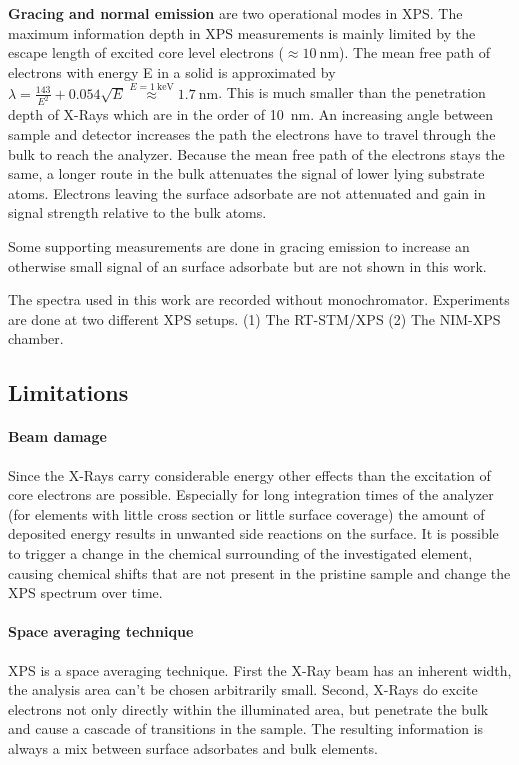 \textbf{Gracing and normal emission} are two operational modes in XPS. The maximum information depth in XPS measurements is mainly limited by the escape length of excited core level electrons ($\approx \SI{10}{\nano \meter}$). The mean free path of electrons with energy E in a solid is approximated by $\lambda = \frac{143}{E^2} + 0.054 \sqrt{E} \stackrel{E=\SI{1}{\kilo \eV}}{\approx} \SI{1.7}{\nano \meter}$.\cite{Seah_Quantitative_1979} This is much smaller than the penetration depth of X-Rays which are in the order of \SI{10}{\nano \meter}. An increasing angle between sample and detector increases the path the electrons have to travel through the bulk to reach the analyzer. Because the mean free path of the electrons stays the same, a longer route in the bulk attenuates the signal of lower lying substrate atoms. Electrons leaving the surface adsorbate are not attenuated and gain in signal strength relative to the bulk atoms.

Some supporting measurements are done in gracing emission to increase an otherwise small signal of an surface adsorbate but are not shown in this work.

The spectra used in this work are recorded without monochromator. Experiments are done at two different XPS setups. (1) The RT-STM/XPS (2) The NIM-XPS chamber.  

\subsection{Limitations}
\paragraph{Beam damage}
Since the X-Rays carry considerable energy other effects than the excitation of core electrons are possible. Especially for long integration times of the analyzer (for elements with little cross section or little surface coverage) the amount of deposited energy results in unwanted side reactions on the surface. It is possible to trigger a change in the chemical surrounding of the investigated element, causing chemical shifts that are not present in the pristine sample and change the XPS spectrum over time.

\paragraph{Space averaging technique}
XPS is a space averaging technique. First the X-Ray beam has an inherent width, the analysis area can't be chosen arbitrarily small. Second, X-Rays do excite electrons not only directly within the illuminated area, but penetrate the bulk and cause a cascade of transitions in the sample. The resulting information is always a mix between surface adsorbates and bulk elements.